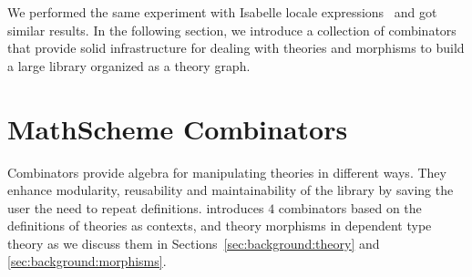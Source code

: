 We performed the same experiment with Isabelle locale expressions~\cite{ballarin2003locales} and got similar results. In the following section, we introduce a collection of combinators that provide solid infrastructure for dealing with theories and morphisms to build a large library organized as a theory graph. 

\section{MathScheme Combinators}
\label{sec:msCombinators}

Combinators provide algebra for manipulating theories in different ways. They enhance modularity, reusability and maintainability of the library by saving the user the need to repeat definitions. \cite{carette2018building} introduces $4$ combinators based on the definitions of theories as contexts, and theory morphisms in dependent type theory as we discuss them in Sections~\ref{sec:background:theory} and \ref{sec:background:morphisms}. %


